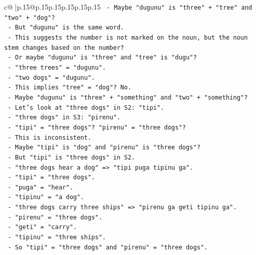 \documentclass{article}
\begin{document}
{\begin{supertabular}{c@{$\;$}|p{.15\linewidth}@{}p{.15\linewidth}p{.15\linewidth}p{.15\linewidth}p{.15\linewidth}p{.15\linewidth}}
{{{\texttt{                  {-} Maybe "dugunu" is "three" + "tree" and "two" + "dog"?} \\
\texttt{                  {-} But "dugunu" is the same word.} \\
\texttt{                  {-} This suggests the number is not marked on the noun, but the noun stem changes based on the number?} \\
\texttt{                  {-} Or maybe "dugunu" is "three" and "tree" is "dugu"?} \\
\texttt{                  {-} "three trees" = "dugunu".} \\
\texttt{                  {-} "two dogs" = "dugunu".} \\
\texttt{                  {-} This implies "tree" = "dog"? No.} \\
\texttt{                  {-} Maybe "dugunu" is "three" + "something" and "two" + "something"?} \\
\texttt{                  {-} Let's look at "three dogs" in S2: "tipi".} \\
\texttt{                  {-} "three dogs" in S3: "pirenu".} \\
\texttt{                  {-} "tipi" = "three dogs"? "pirenu" = "three dogs"?} \\
\texttt{                  {-} This is inconsistent.} \\
\texttt{                  {-} Maybe "tipi" is "dog" and "pirenu" is "three dogs"?} \\
\texttt{                  {-} But "tipi" is "three dogs" in S2.} \\
\texttt{                  {-} "three dogs hear a dog" => "tipi puga tipinu ga".} \\
\texttt{                    {-} "tipi" = "three dogs".} \\
\texttt{                    {-} "puga" = "hear".} \\
\texttt{                    {-} "tipinu" = "a dog".} \\
\texttt{                  {-} "three dogs carry three ships" => "pirenu ga geti tipinu ga".} \\
\texttt{                    {-} "pirenu" = "three dogs".} \\
\texttt{                    {-} "geti" = "carry".} \\
\texttt{                    {-} "tipinu" = "three ships".} \\
\texttt{                  {-} So "tipi" = "three dogs" and "pirenu" = "three dogs".} \\
}}}
\end{supertabular}}
\end{document}
